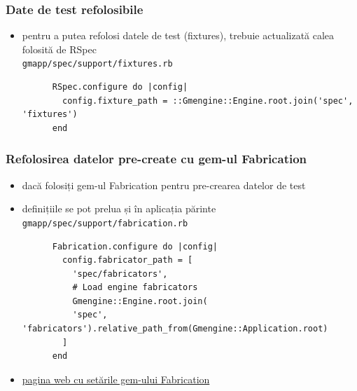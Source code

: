 \documentclass[compress]{beamer}
\begin{document}
\begin{frame}[fragile]
\frametitle{Date de test refolosibile}
\begin{itemize}
  \item pentru a putea refolosi datele de test (fixtures), trebuie actualizată calea folosită de RSpec
    \\
    \texttt{gmapp/spec/support/fixtures.rb}
    \begin{verbatim}
      RSpec.configure do |config|
        config.fixture_path = ::Gmengine::Engine.root.join('spec', 'fixtures')
      end
    \end{verbatim}
\end{itemize}
\end{frame}

\begin{frame}[fragile]
\frametitle{Refolosirea datelor pre-create cu gem-ul Fabrication}
\begin{itemize}
  \item dacă folosiți gem-ul Fabrication pentru pre-crearea datelor de test
  \item definițiile se pot prelua și în aplicația părinte
    \texttt{gmapp/spec/support/fabrication.rb}
    \begin{verbatim}
      Fabrication.configure do |config|
        config.fabricator_path = [
          'spec/fabricators',
          # Load engine fabricators
          Gmengine::Engine.root.join(
          'spec', 'fabricators').relative_path_from(Gmengine::Application.root)
        ]
      end
    \end{verbatim}
  \item \href{http://www.fabricationgem.org/#!configuration}{pagina web cu setările gem-ului Fabrication}
\end{itemize}
\end{frame}
\end{document}
